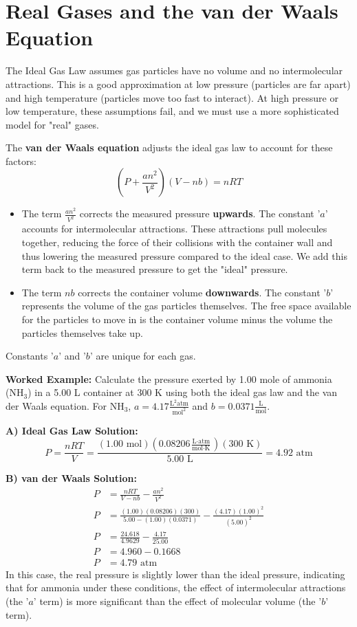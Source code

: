 \documentclass{article}
\begin{document}
\section{Real Gases and the van der Waals Equation}
The Ideal Gas Law assumes gas particles have no volume and no intermolecular attractions. This is a good approximation at low pressure (particles are far apart) and high temperature (particles move too fast to interact). At high pressure or low temperature, these assumptions fail, and we must use a more sophisticated model for "real" gases.

The \textbf{van der Waals equation} adjusts the ideal gas law to account for these factors:
\[ \left( P + \frac{an^2}{V^2} \right) (V - nb) = nRT \]
\begin{itemize}
    \item The term $\frac{an^2}{V^2}$ corrects the measured pressure \textbf{upwards}. The constant '$a$' accounts for intermolecular attractions. These attractions pull molecules together, reducing the force of their collisions with the container wall and thus lowering the measured pressure compared to the ideal case. We add this term back to the measured pressure to get the "ideal" pressure.
    \item The term $nb$ corrects the container volume \textbf{downwards}. The constant '$b$' represents the volume of the gas particles themselves. The free space available for the particles to move in is the container volume minus the volume the particles themselves take up.
\end{itemize}
Constants '$a$' and '$b$' are unique for each gas.

\textbf{Worked Example:}
Calculate the pressure exerted by 1.00 mole of ammonia (NH$_3$) in a 5.00 L container at 300 K using both the ideal gas law and the van der Waals equation. For NH$_3$, $a = 4.17 \frac{\text{L}^2\text{atm}}{\text{mol}^2}$ and $b = 0.0371 \frac{\text{L}}{\text{mol}}$.

\textbf{A) Ideal Gas Law Solution:}
\[ P = \frac{nRT}{V} = \frac{(1.00 \text{ mol})(0.08206 \frac{\text{L} \cdot \text{atm}}{\text{mol} \cdot \text{K}})(300 \text{ K})}{5.00 \text{ L}} = 4.92 \text{ atm} \]

\textbf{B) van der Waals Solution:}
\begin{align*}
    P &= \frac{nRT}{V-nb} - \frac{an^2}{V^2} \\
    P &= \frac{(1.00)(0.08206)(300)}{5.00 - (1.00)(0.0371)} - \frac{(4.17)(1.00)^2}{(5.00)^2} \\
    P &= \frac{24.618}{4.9629} - \frac{4.17}{25.00} \\
    P &= 4.960 - 0.1668 \\
    P &= 4.79 \text{ atm}
\end{align*}
In this case, the real pressure is slightly lower than the ideal pressure, indicating that for ammonia under these conditions, the effect of intermolecular attractions (the '$a$' term) is more significant than the effect of molecular volume (the '$b$' term).
\end{document}
